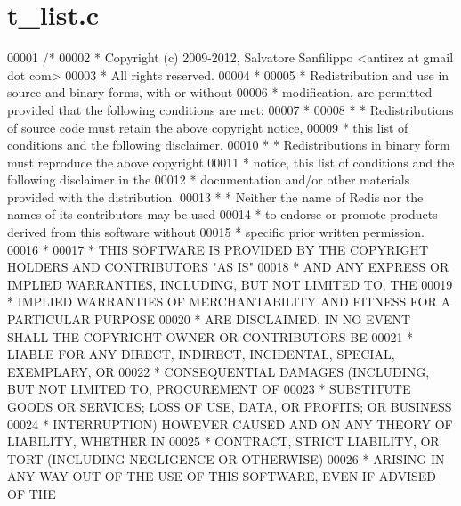 \hypertarget{t__list_8c_source}{}\section{t\+\_\+list.\+c}
\label{t__list_8c_source}

\begin{DoxyCode}
00001 \textcolor{comment}{/*}
00002 \textcolor{comment}{ * Copyright (c) 2009-2012, Salvatore Sanfilippo <antirez at gmail dot com>}
00003 \textcolor{comment}{ * All rights reserved.}
00004 \textcolor{comment}{ *}
00005 \textcolor{comment}{ * Redistribution and use in source and binary forms, with or without}
00006 \textcolor{comment}{ * modification, are permitted provided that the following conditions are met:}
00007 \textcolor{comment}{ *}
00008 \textcolor{comment}{ *   * Redistributions of source code must retain the above copyright notice,}
00009 \textcolor{comment}{ *     this list of conditions and the following disclaimer.}
00010 \textcolor{comment}{ *   * Redistributions in binary form must reproduce the above copyright}
00011 \textcolor{comment}{ *     notice, this list of conditions and the following disclaimer in the}
00012 \textcolor{comment}{ *     documentation and/or other materials provided with the distribution.}
00013 \textcolor{comment}{ *   * Neither the name of Redis nor the names of its contributors may be used}
00014 \textcolor{comment}{ *     to endorse or promote products derived from this software without}
00015 \textcolor{comment}{ *     specific prior written permission.}
00016 \textcolor{comment}{ *}
00017 \textcolor{comment}{ * THIS SOFTWARE IS PROVIDED BY THE COPYRIGHT HOLDERS AND CONTRIBUTORS "AS IS"}
00018 \textcolor{comment}{ * AND ANY EXPRESS OR IMPLIED WARRANTIES, INCLUDING, BUT NOT LIMITED TO, THE}
00019 \textcolor{comment}{ * IMPLIED WARRANTIES OF MERCHANTABILITY AND FITNESS FOR A PARTICULAR PURPOSE}
00020 \textcolor{comment}{ * ARE DISCLAIMED. IN NO EVENT SHALL THE COPYRIGHT OWNER OR CONTRIBUTORS BE}
00021 \textcolor{comment}{ * LIABLE FOR ANY DIRECT, INDIRECT, INCIDENTAL, SPECIAL, EXEMPLARY, OR}
00022 \textcolor{comment}{ * CONSEQUENTIAL DAMAGES (INCLUDING, BUT NOT LIMITED TO, PROCUREMENT OF}
00023 \textcolor{comment}{ * SUBSTITUTE GOODS OR SERVICES; LOSS OF USE, DATA, OR PROFITS; OR BUSINESS}
00024 \textcolor{comment}{ * INTERRUPTION) HOWEVER CAUSED AND ON ANY THEORY OF LIABILITY, WHETHER IN}
00025 \textcolor{comment}{ * CONTRACT, STRICT LIABILITY, OR TORT (INCLUDING NEGLIGENCE OR OTHERWISE)}
00026 \textcolor{comment}{ * ARISING IN ANY WAY OUT OF THE USE OF THIS SOFTWARE, EVEN IF ADVISED OF THE}

\end{DoxyCode}

